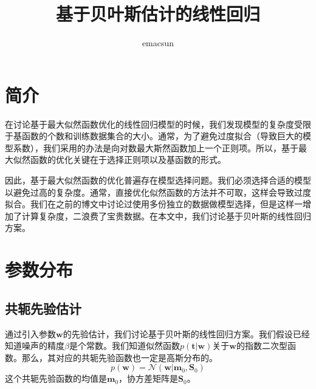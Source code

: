 \documentclass[10pt,a4paper,UTF8]{article}
\author{emacsun}
\date{}
\title{基于贝叶斯估计的线性回归}
\begin{document}
\maketitle
\tableofcontents
{}

\section{简介}
\label{sec:orge8b1154}


在讨论基于最大似然函数优化的线性回归模型的时候，我们发现模型的复杂度受限于基函数的个数和训练数据集合的大小。通常，为了避免过度拟合（导致巨大的模型系数），我们采用的办法是向对数最大斯然函数加上一个正则项。所以，基于最大似然函数的优化关键在于选择正则项以及基函数的形式。

因此，基于最大似然函数的优化普遍存在模型选择问题。我们必须选择合适的模型以避免过高的复杂度。通常，直接优化似然函数的方法并不可取，这样会导致过度拟合。我们在之前的博文中讨论过使用多份独立的数据做模型选择，但是这样一增加了计算复杂度，二浪费了宝贵数据。在本文中，我们讨论基于贝叶斯的线性回归方案。

\section{参数分布}
\label{sec:orgb20e6cb}


\subsection{共轭先验估计}
\label{sec:org7463ad2}


通过引入参数\(\mathbf{w}\)的先验估计，我们讨论基于贝叶斯的线性回归方案。我们假设已经知道噪声的精度\(\beta\)是个常数。我们知道似然函数\(p(\mathbf{t}|\mathbf{w})\)关于\(\mathbf{w}\)的指数二次型函数。那么，其对应的共轭先验函数也一定是高斯分布的。
\begin{equation}
\label{eq:1}
p(\mathbf{w}) = \mathcal{N}(\mathbf{w}|\mathbf{m}_{0},\mathbf{S}_{0})
\end{equation}
这个共轭先验函数的均值是\(\mathbf{m}_{0}\)，协方差矩阵是\(\mathbf{S}_{0}\)。
\end{document}
